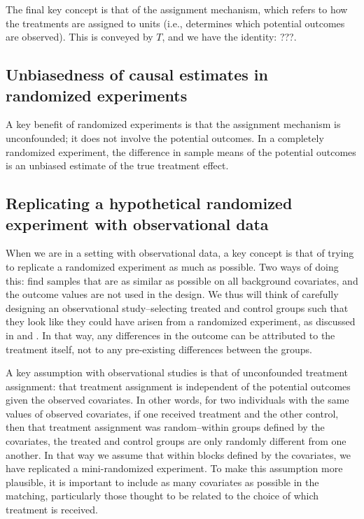 \documentclass[11pt,titlepage]{article}
\begin{document}
The final key concept is that of the assignment mechanism, which refers to how the treatments are assigned to units (i.e., determines which potential outcomes
are observed).  This is conveyed by $T$, and we have the identity: ???.  

\subsection{Unbiasedness of causal estimates in randomized experiments}
A key benefit of randomized experiments is that the assignment mechanism is unconfounded; it does not involve the potential outcomes.  
In a completely randomized experiment, the difference in sample means of the potential outcomes is an unbiased estimate of the true treatment effect.  


\subsection{Replicating a hypothetical randomized experiment with observational data}
When we are in a setting with observational data, a key concept is that of trying to replicate a randomized experiment as much as possible.  
Two ways of doing this: find samples that are as similar as possible on all background covariates, and the outcome values are not used in the design.  We thus
will think of carefully designing an observational study--selecting treated and control groups such that they look like they could have arisen from a randomized
experiment, as discussed in \cite{Rubin91, Rubin01} and \cite{Rosenbaum99}.  
In that way, any differences in the outcome can be attributed to the treatment itself, not to any pre-existing differences between the groups. 

A key assumption with observational studies is that of unconfounded treatment assignment: that treatment assignment is independent of the potential outcomes
given the observed covariates.  In other words, for two individuals with the same values of observed covariates, if one received treatment and the other control,
then that treatment assignment was random--within groups defined by the covariates, the treated and control groups are only randomly different from one another.
In that way we assume that within blocks defined by the covariates, we have replicated a mini-randomized experiment.   To make this assumption more plausible,
it is important to include as many covariates as possible in the matching, particularly those thought to be related to the choice of which treatment is received.
\end{document}
